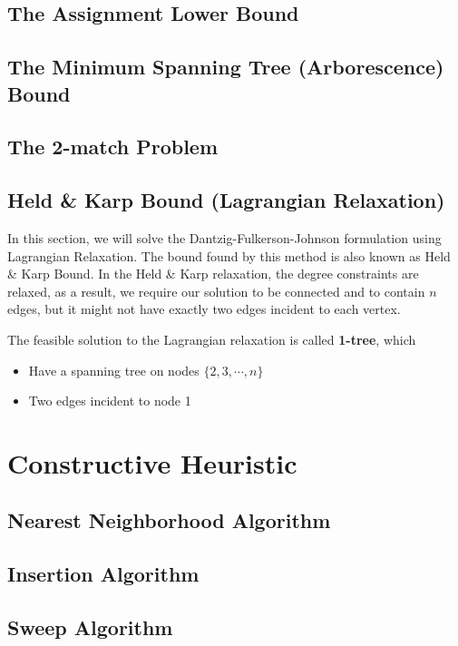 				\subsection{The Assignment Lower Bound}

				\subsection{The Minimum Spanning Tree (Arborescence) Bound}

				\subsection{The 2-match Problem}

				\subsection{Held \& Karp Bound (Lagrangian Relaxation)}
					In this section, we will solve the Dantzig-Fulkerson-Johnson formulation using Lagrangian Relaxation. The bound found by this method is also known as Held \& Karp Bound. In the Held \& Karp relaxation, the degree constraints are relaxed, as a result, we require our solution to be connected and to contain $n$ edges, but it might not have exactly two edges incident to each vertex.

					The feasible solution to the Lagrangian relaxation is called \textbf{1-tree}, which
					\begin{itemize}
						\item Have a spanning tree on nodes $\{2, 3, \cdots, n\}$
						\item Two edges incident to node 1
					\end{itemize}

			\section{Constructive Heuristic}
				\subsection{Nearest Neighborhood Algorithm}

				\subsection{Insertion Algorithm}

				\subsection{Sweep Algorithm}

